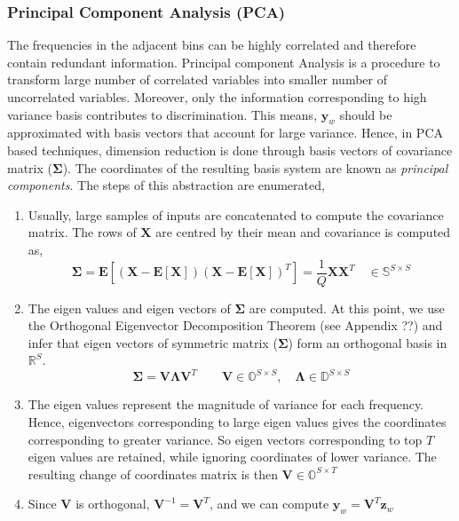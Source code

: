 \subsubsection{Principal Component Analysis (PCA)}
The frequencies in the adjacent bins can be highly correlated and therefore contain redundant information. Principal component Analysis is a procedure to transform large number of correlated variables into smaller number of uncorrelated variables. Moreover, only the information corresponding to high variance basis contributes to discrimination. This means, $\textbf{y}_{w}$ should be approximated with basis vectors that account for large variance. Hence, in PCA based techniques, dimension reduction is done through basis vectors of covariance matrix ($\bm{\Sigma}$). The coordinates of the resulting basis system are known as \textit{principal components}. The steps of this abstraction are enumerated,
\begin{enumerate}[label=(\alph*)]
\item Usually, large samples of inputs are concatenated to compute the covariance matrix. The rows of $\textbf{X}$ are centred by their mean and covariance is computed as,
\[
   \bm{\Sigma} = \textbf{E}[(\textbf{X} - \textbf{E}[\textbf{X}])(\textbf{X} - \textbf{E}[\textbf{X}])^{T}] = \frac{1}{Q}\textbf{\^X}\textbf{\^X}^{T} \quad \in \mathbb{S}^{S \times S}
\]
\item The eigen values and eigen vectors of $\bm{\Sigma}$ are computed. At this point, we use the Orthogonal Eigenvector Decomposition Theorem (see Appendix ??) and infer that eigen vectors of symmetric matrix ($\bm{\Sigma}$) form an orthogonal basis in $\mathbb{R}^{S}$. 
\[
\bm{\Sigma} = \textbf{V}\bm{\Lambda}\textbf{V}^{T} \qquad \textbf{V} \in \mathbb{O}^{S \times S}, \quad \bm{\Lambda} \in \mathbb{D}^{S \times S}
\]

\item The eigen values represent the magnitude of variance for each frequency.  Hence, eigenvectors corresponding to large eigen values gives the coordinates corresponding to greater variance. So eigen vectors corresponding to top $T$ eigen values are retained, while ignoring coordinates of lower variance. The resulting change of coordinates matrix is then $\textbf{\^V} \in \mathbb{O}^{S \times T}$
   
\item Since $\textbf{\^V}$ is orthogonal, $\textbf{\^{V}}^{-1} = \textbf{\^{V}}^{T}$, and we can compute $\textbf{y}_{w} = \textbf{\^{V}}^{T}\textbf{z}_{w}$

\end{enumerate}   

